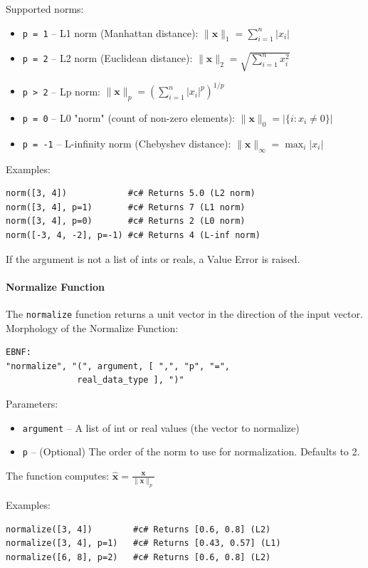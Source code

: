 \documentclass{report}
\begin{document}
Supported norms:
\begin{itemize}
\item \texttt{p = 1} -- L1 norm (Manhattan distance): $\|\mathbf{x}\|_1 = \sum_{i=1}^n |x_i|$
\item \texttt{p = 2} -- L2 norm (Euclidean distance): $\|\mathbf{x}\|_2 = \sqrt{\sum_{i=1}^n x_i^2}$
\item \texttt{p > 2} -- Lp norm: $\|\mathbf{x}\|_p = \left(\sum_{i=1}^n |x_i|^p\right)^{1/p}$
\item \texttt{p = 0} -- L0 "norm" (count of non-zero elements): $\|\mathbf{x}\|_0 = |\{i : x_i \neq 0\}|$
\item \texttt{p = -1} -- L-infinity norm (Chebyshev distance): $\|\mathbf{x}\|_\infty = \max_i |x_i|$
\end{itemize}

Examples:
\begin{verbatim}
norm([3, 4])            #c# Returns 5.0 (L2 norm)
norm([3, 4], p=1)       #c# Returns 7 (L1 norm)
norm([3, 4], p=0)       #c# Returns 2 (L0 norm)
norm([-3, 4, -2], p=-1) #c# Returns 4 (L-inf norm)
\end{verbatim}

If the argument is not a list of ints or reals, a Value Error is raised.

\paragraph{Normalize Function}
The \texttt{normalize} function returns a unit vector in the direction of the input vector. \\
Morphology of the Normalize Function:
\begin{verbatim}
EBNF:
"normalize", "(", argument, [ ",", "p", "=", 
              real_data_type ], ")"
\end{verbatim}
Parameters:
\begin{itemize}
\item \texttt{argument} -- A list of int or real values (the vector to normalize)
\item \texttt{p} -- (Optional) The order of the norm to use for normalization. Defaults to 2.
\end{itemize}

The function computes: $\hat{\mathbf{x}} = \frac{\mathbf{x}}{\|\mathbf{x}\|_p}$

Examples:
\begin{verbatim}
normalize([3, 4])        #c# Returns [0.6, 0.8] (L2)
normalize([3, 4], p=1)   #c# Returns [0.43, 0.57] (L1)
normalize([6, 8], p=2)   #c# Returns [0.6, 0.8] (L2)
\end{verbatim}
\end{document}

